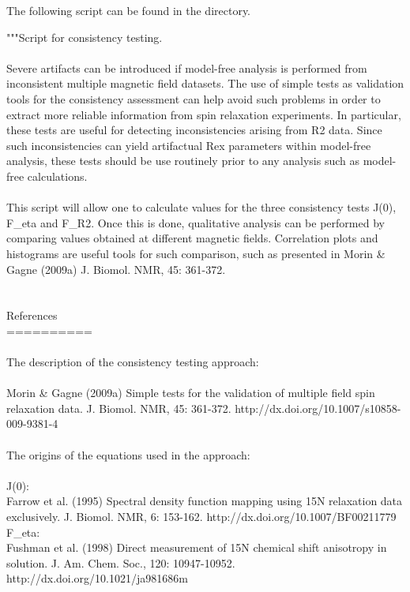 The following script can be found in the  directory.

\begin{exampleenv}
"""Script for consistency testing. \\
 \\
Severe artifacts can be introduced if model-free analysis is performed from inconsistent multiple magnetic field datasets. The use of simple tests as validation tools for the consistency assessment can help avoid such problems in order to extract more reliable information from spin relaxation experiments. In particular, these tests are useful for detecting inconsistencies arising from R2 data. Since such inconsistencies can yield artifactual Rex parameters within model-free analysis, these tests should be use routinely prior to any analysis such as model-free calculations. \\
 \\
This script will allow one to calculate values for the three consistency tests J(0), F\_eta and F\_R2. Once this is done, qualitative analysis can be performed by comparing values obtained at different magnetic fields. Correlation plots and histograms are useful tools for such comparison, such as presented in Morin \& Gagne (2009a) J. Biomol. NMR, 45: 361-372. \\
 \\
 \\
References \\
========== \\
 \\
The description of the consistency testing approach: \\
 \\
    Morin \& Gagne (2009a) Simple tests for the validation of multiple field spin relaxation data. J. Biomol. NMR, 45: 361-372. http://dx.doi.org/10.1007/s10858-009-9381-4 \\
 \\
The origins of the equations used in the approach: \\
 \\
    J(0): \\
        Farrow et al. (1995) Spectral density function mapping using 15N relaxation data exclusively. J. Biomol. NMR, 6: 153-162. http://dx.doi.org/10.1007/BF00211779 \\

    F\_eta: \\
        Fushman et al. (1998) Direct measurement of 15N chemical shift anisotropy in solution. J. Am. Chem. Soc., 120: 10947-10952. http://dx.doi.org/10.1021/ja981686m \\


\end{exampleenv}
